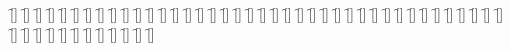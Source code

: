 \begin{questions}
\begin{multicols}{2}
        \question  \f[]
        \question  \f[]
        \question  \f[]
        \question  \f[]
        \question  \f[]
        \question  \f[]
        \question  \f[]
        \question  \f[]
        \question  \f[]
        \question  \f[]
        \question  \f[]
        \question  \f[]
        \question  \f[]
        \question  \f[]
        \question  \f[]
        \question  \f[]
        \question  \f[]
        \question  \f[]
        \question  \f[]
        \question  \f[]
        \question  \f[]
        \question  \f[]
        \question  \f[]
        \question  \f[]
        \question  \f[]
        \question  \f[]
        \question  \f[]
        \question  \f[]
        \question  \f[]
        \question  \f[]
        \question  \f[]
        \question  \f[]
        \question  \f[]
        \question  \f[]
        \question  \f[]
        \question  \f[]
        \question  \f[]
        \question  \f[]
        \question  \f[]
        \question  \f[]
        \question  \f[]
        \question  \f[]
        \question  \f[]
        \question  \f[]
        \question  \f[]
        \question  \f[]
        \question  \f[]
        \question  \f[]
        \question  \f[]
        \question  \f[]
        \question  \f[]
        \question  \f[]
    \end{multicols}
\end{questions}
